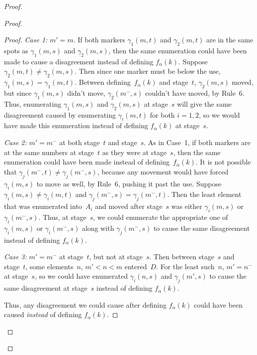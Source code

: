 \documentclass{LMCS}
\newcommand{\0}{\mathbf{0}}
\newcommand{\<}{\langle}
\renewcommand{\>}{\rangle}
\begin{document}
\begin{proof}
\begin{proof}
\begin{proof}
\smallskip
{\em Case 1:} $m'=m$.  If both markers $\gamma_1(m,t)$ and $\gamma_2(m,t)$
are in the same spots as $\gamma_1(m,s)$ and $\gamma_2(m,s)$, then the same
enumeration could have been made to cause a disagreement instead of defining
$f_\alpha(k)$.  Suppose $\gamma_2(m,t)\neq \gamma_2(m,s)$.  Then since one
marker must be below the use, $\gamma_1(m,s)=\gamma_1(m,t)$.  Between
defining~$f_\alpha(k)$ and stage~$t$, $\gamma_2(m,s)$ moved, but since
$\gamma_1(m,s)$ didn't move, $\gamma_2(m^-,s)$ couldn't have moved, by
Rule~6.  Thus, enumerating $\gamma_1(m,s)$ and $\gamma_2(m,s)$ at stage~$s$
will give the same disagreement caused by enumerating $\gamma_i(m,t)$ for
both $i=1,2$, so we would have made this enumeration instead of defining
$f_\alpha(k)$ at stage~$s$.

\smallskip
{\em Case 2:} $m'=m^-$ at both stage~$t$ and stage~$s$.  As in Case~1, if
both markers are at the same numbers at stage~$t$ as they were at stage~$s$,
then the same enumeration could have been made instead of
defining~$f_\alpha(k)$. It is not possible that $\gamma_j(m^-,t)\neq
\gamma_j(m^-, s)$, because any movement would have forced $\gamma_i(m,s)$ to
move as well, by Rule~6, pushing it past the use.  Suppose $\gamma_i(m,s)\neq
\gamma_i(m,t)$ and $\gamma_j(m^-,s)=\gamma_j(m^-,t).$  Then the least element
that was enumerated into~$A_i$ and moved after stage~$s$ was either
$\gamma_i(m,s)$ or $\gamma_i(m^-,s)$.  Thus, at stage~$s$, we could enumerate
the appropriate one of $\gamma_i(m,s)$ or $\gamma_i(m^-,s)$ along with
$\gamma_j(m^-,s)$ to cause the same disagreement instead of defining
$f_\alpha(k)$.

\smallskip
{\em Case 3:} $m'=m^-$ at stage~$t$, but not at stage~$s$.  Then between
stage~$s$ and stage~$t$, some elements~$n$, $m'<n<m$ entered~$D$.  For the
least such~$n$, $m'=n^-$ at stage~$s$, so we could have enumerated
$\gamma_i(n,s)$ and $\gamma_j(m', s)$ to cause the same disagreement at
stage~$s$ instead of defining $f_\alpha(k)$.





Thus, any disagreement we could cause after defining $f_\alpha(k)$ could have
been caused {\em instead} of defining $f_\alpha(k)$.
\end{proof}


\end{proof}
\end{proof}
\end{document}
